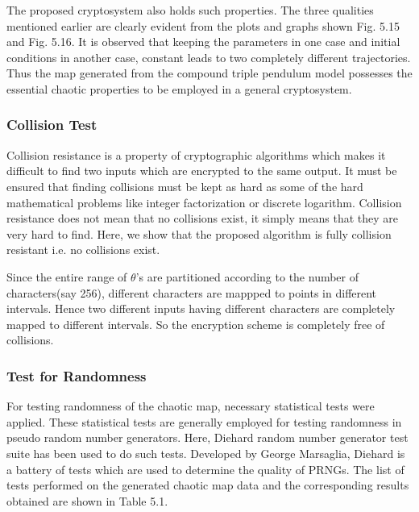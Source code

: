 The proposed cryptosystem also holds such properties. The three qualities mentioned earlier are clearly evident from the plots and graphs shown Fig. 5.15 and Fig. 5.16. It is observed that keeping the parameters in one case and initial conditions in another case, constant leads to two completely different trajectories. Thus the map generated from the compound triple pendulum model possesses the essential chaotic properties to be employed in a general cryptosystem. 

\subsubsection{Collision Test}
Collision resistance is a property of cryptographic algorithms which makes it difficult to find two inputs which are encrypted to the same output. It must be ensured that finding collisions must be kept as hard as some of the hard mathematical problems like integer factorization  or discrete logarithm. Collision resistance does not mean that no collisions exist, it simply means that they are very hard to find. Here, we show that the proposed algorithm is fully collision resistant i.e. no collisions exist.

Since the entire range of $\theta$'s are partitioned according to the number of characters(say 256), different characters are mappped to points in different intervals. Hence two different inputs having different characters are completely mapped to different intervals. So the encryption scheme is completely free of collisions. 

\subsubsection{Test for Randomness}
For testing randomness of the chaotic map, necessary statistical tests were applied. These statistical tests are generally employed for testing randomness in pseudo random number generators. Here, Diehard random number generator test suite has been used to do such tests. Developed by George Marsaglia, Diehard is a battery of tests which are used to determine the quality of PRNGs. The list of tests performed on the generated chaotic map data and the corresponding results obtained are shown in Table 5.1.

